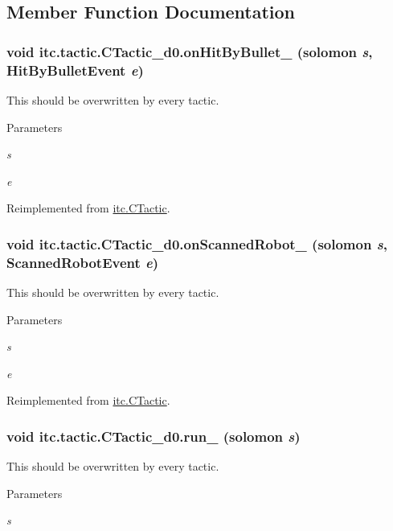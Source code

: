 \subsection{Member Function Documentation}
\hypertarget{classitc_1_1tactic_1_1_c_tactic__d0_a4af101273ae2df9ee3c58641e1b1e422}{
\subsubsection[{onHitByBullet\_\-}]{\setlength{\rightskip}{0pt plus 5cm}void itc.tactic.CTactic\_\-d0.onHitByBullet\_\- ({\bf solomon} {\em s}, \/  HitByBulletEvent {\em e})}}
\label{classitc_1_1tactic_1_1_c_tactic__d0_a4af101273ae2df9ee3c58641e1b1e422}
This should be overwritten by every tactic. 
\begin{DoxyParams}{Parameters}
\item[{\em s}]\item[{\em e}]\end{DoxyParams}


Reimplemented from \hyperlink{classitc_1_1_c_tactic_a9a8d125f826667459758f2767c3bd957}{itc.CTactic}.\hypertarget{classitc_1_1tactic_1_1_c_tactic__d0_a85a50bae05c5e1b1bf7bdc450325ae0e}{
\subsubsection[{onScannedRobot\_\-}]{\setlength{\rightskip}{0pt plus 5cm}void itc.tactic.CTactic\_\-d0.onScannedRobot\_\- ({\bf solomon} {\em s}, \/  ScannedRobotEvent {\em e})}}
\label{classitc_1_1tactic_1_1_c_tactic__d0_a85a50bae05c5e1b1bf7bdc450325ae0e}
This should be overwritten by every tactic. 
\begin{DoxyParams}{Parameters}
\item[{\em s}]\item[{\em e}]\end{DoxyParams}


Reimplemented from \hyperlink{classitc_1_1_c_tactic_a63a5a64ff30293061e37eca71fb77a96}{itc.CTactic}.\hypertarget{classitc_1_1tactic_1_1_c_tactic__d0_a1f8e1863b6d1848867239230dd77b8f8}{
\subsubsection[{run\_\-}]{\setlength{\rightskip}{0pt plus 5cm}void itc.tactic.CTactic\_\-d0.run\_\- ({\bf solomon} {\em s})}}
\label{classitc_1_1tactic_1_1_c_tactic__d0_a1f8e1863b6d1848867239230dd77b8f8}
This should be overwritten by every tactic. 
\begin{DoxyParams}{Parameters}
\item[{\em s}]\end{DoxyParams}


